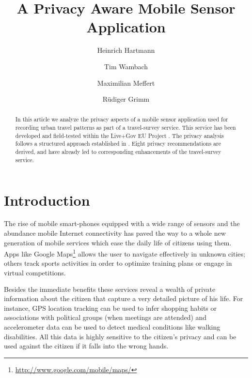 \documentclass[runningheads,a4paper]{llncs}
\begin{document}

\title{A Privacy Aware Mobile Sensor Application}

\author{Heinrich Hartmann \and Tim Wambach \and Maximilian Meffert \and R\"udiger Grimm}
\maketitle


\begin{abstract}
In this article we analyze the privacy aspects of a mobile sensor
application used for recording urban travel patterns as part of a
travel-survey service. This service has been developed and
field-tested within the Live+Gov EU Project \cite{LiveGov:Prog}. The privacy analysis
follows a structured approach established in
\cite{Grimm:ItSecRefModel}. Eight privacy recommendations are derived,
and have already led to corresponding enhancements of the
travel-survey service.


\end{abstract}


\section{Introduction}
\label{sec:intro}


The rise of mobile smart-phones equipped with a wide range of sensors
and the abundance mobile Internet connectivity has paved the way to a
whole new generation of mobile services which ease the daily life of
citizens using them. Apps like Google
Maps\footnote{\url{http://www.google.com/mobile/maps/}} allows the user to
navigate effectively in unknown cities; others track sports activities
in order to optimize training plans or engage in virtual competitions.

Besides the immediate benefits these services reveal a wealth of
private information about the citizen that capture a very detailed
picture of his life. For instance, GPS location tracking can be used
to infer shopping habits or associations with political groups (when
meetings are attended) and accelerometer data can be used to detect
medical conditions like walking disabilities. All this data is highly
sensitive to the citizen's privacy and can be used against the citizen 
if it falls into the wrong hands.
\end{document}
